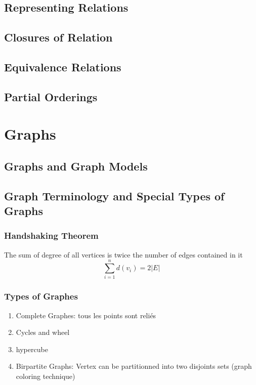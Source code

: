 \documentclass{article}
\begin{document}
\subsection{Representing Relations}
\subsection{Closures of Relation}
\subsection{Equivalence Relations}
\subsection{Partial Orderings}

\section{Graphs}

\subsection{Graphs and Graph Models}
\subsection{Graph Terminology and Special Types of Graphs}

\subsubsection{Handshaking Theorem}%
\label{ssub:Handshaking Theorem}

\begin{theorem}
    The sum of degree of all vertices is twice the number of edges
    contained in it
    $$ \sum^{n}_{i=1} d(v_i) = 2 |E| $$
\end{theorem}

\subsubsection{Types of Graphes}%
\label{ssub:Types of Graphes}

\begin{enumerate}
    \item Complete Graphes: tous les points sont reliés
    \item Cycles and wheel
    \item hypercube
    \item Birpartite Graphs: Vertex can be partitionned into two
	disjoints sets (graph coloring technique)
\end{enumerate}
\end{document}
